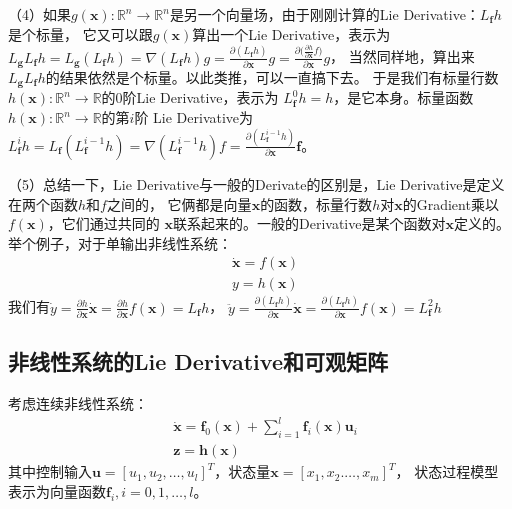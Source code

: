 \documentclass{article}
\begin{document}
（4）如果$g(\textbf{x}):\mathbb{R}^n\rightarrow\mathbb{R}^n$是另一个向量场，由于刚刚计算的Lie Derivative：$L_\textbf{f}h$是个标量，
它又可以跟$g(\textbf{x})$算出一个Lie Derivative，表示为
$L_\textbf{g}L_\textbf{f}h=L_\textbf{g}(L_\textbf{f}h)=\nabla(L_\textbf{f}h)g=\frac{\partial(L_\textbf{f}h)}{\partial{\textbf{x}}}g
=\frac{\partial({\frac{\partial{h}}{\partial{\textbf{x}}}f)}}{\partial{\textbf{x}}}g$，
当然同样地，算出来$L_\textbf{g}L_\textbf{f}h$的结果依然是个标量。以此类推，可以一直搞下去。
于是我们有标量行数$h(\textbf{x}):\mathbb{R}^n\rightarrow\mathbb{R}$的0阶Lie Derivative，表示为
$L_\textbf{f}^0h=h$，是它本身。标量函数$h(\textbf{x}):\mathbb{R}^n\rightarrow\mathbb{R}$的第$i$阶
Lie Derivative为$L_\textbf{f}^ih=L_\textbf{f}(L_\textbf{f}^{i-1}h)=\nabla(L_{\textbf{f}}^{i-1}h)f=\frac{\partial(L_{\textbf{f}}^{i-1}h)}{\partial{\textbf{x}}}\textbf{f}$。\par
（5）总结一下，Lie Derivative与一般的Derivate的区别是，Lie Derivative是定义在两个函数$h$和$f$之间的，
它俩都是向量$\textbf{x}$的函数，标量行数$h$对$\textbf{x}$的Gradient乘以$f(\textbf{x})$，它们通过共同的
$\textbf{x}$联系起来的。一般的Derivative是某个函数对$\textbf{x}$定义的。举个例子，对于单输出非线性系统：
\begin{equation}
\begin{aligned}
    &\dot{\textbf{x}}=f(\textbf{x})\\
    &y=h(\textbf{x})
\end{aligned}
\end{equation}
我们有$\dot{y}=\frac{\partial{h}}{\partial{\textbf{x}}}\dot{\textbf{x}}=\frac{\partial{h}}{\partial{\textbf{x}}}f(\textbf{x})=L_\textbf{f}h$，
$\ddot{y}=\frac{\partial(L_\textbf{f}h)}{\partial{\textbf{x}}}\dot{\textbf{x}}=\frac{\partial(L_{\textbf{f}}h)}{\partial{\textbf{x}}}f(\textbf{x})=L_{\textbf{f}}^{2}h$

\subsection{非线性系统的Lie Derivative和可观矩阵}
考虑连续非线性系统：
\begin{equation}\label{eqs:nonlinearsys1}
    \begin{aligned}
    &\dot{\textbf{x}}=\textbf{f}_0(\textbf{x})+\sum\limits_{i=1}^{l}\textbf{f}_{i}(\textbf{x})\textbf{u}_i\\
    &\textbf{z}=\textbf{h}(\textbf{x})
    \end{aligned}
\end{equation}
其中控制输入$\textbf{u}=\left[u_1,u_2,\ldots, u_l\right]^T$，状态量$\textbf{x}=\left[x_1,x_2.\ldots,x_m\right]^T$，
状态过程模型表示为向量函数$\textbf{f}_i,i=0,1,\ldots,l$。\par
\end{document}
